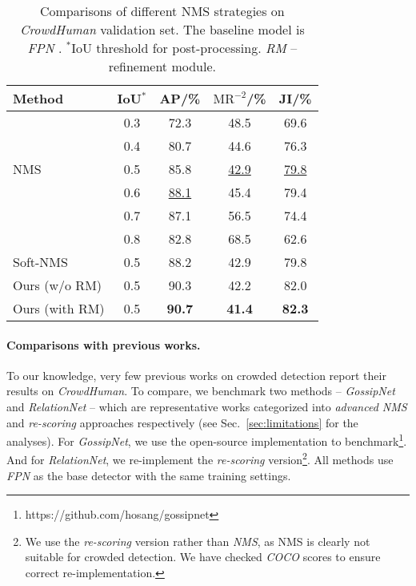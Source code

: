 \documentclass[10pt,twocolumn,letterpaper]{article}
\begin{document}
\begin{table}[t]
	\centering
	\begin{tabular}{l|c|ccc}
\toprule
		Method & IoU$^*$ & AP/\% & $\text{MR}^{-2}$/\%  & JI/\% \\
		\hline
		 & 0.3 & 72.3 & 48.5 & 69.6 \\
		 & 0.4 & 80.7 & 44.6 & 76.3 \\
		NMS & 0.5 & 85.8 & \underline{42.9} & \underline{79.8} \\
		 & 0.6 & \underline{88.1} & 45.4 & 79.4 \\
		 & 0.7 & 87.1 & 56.5 & 74.4 \\
		 & 0.8 & 82.8 & 68.5 & 62.6 \\
		\hline
		 Soft-NMS ~\cite{softnms} & 0.5 & 88.2 & 42.9 & 79.8 \\
		\hline
		Ours (w/o RM) & 0.5 & 90.3 & 42.2 &  82.0  \\
		Ours (with RM) & 0.5 & \textbf{90.7} & \textbf{41.4} & \textbf{82.3} \\
		\bottomrule
	\end{tabular}
	\caption{ Comparisons of different NMS strategies on \emph{CrowdHuman} validation set. The baseline model is \emph{FPN} \cite{lin2017feature}. $^*$IoU threshold for post-processing.  \emph{RM} -- refinement module. }
	\label{tbl:crowdhuman_nms}
\end{table} 

\paragraph{Comparisons with previous works. }
To our knowledge, very few previous works on crowded detection  report their results on \emph{CrowdHuman}. To compare, we benchmark two methods -- \emph{GossipNet} \cite{learningnms} and \emph{RelationNet} \cite{hu2017relation}  -- which are representative works categorized into \emph{advanced NMS} and \emph{re-scoring} approaches respectively (see Sec.~\ref{sec:limitations} for the analyses). For \emph{GossipNet}, we use the open-source implementation to benchmark\footnote{https://github.com/hosang/gossipnet}. And for \emph{RelationNet}, we re-implement the \emph{re-scoring} version\footnote{We use the \emph{re-scoring} version rather than \emph{NMS}, as NMS is clearly not suitable for crowded detection. We have checked \emph{COCO} \cite{lin2014microsoft} scores to ensure correct re-implementation.  }. All methods use \emph{FPN} \cite{lin2017feature} as the base detector with the same training settings. 
\end{document}
